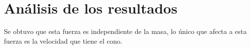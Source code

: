 \section{Análisis de los resultados}

Se obtuvo que esta fuerza es independiente de la masa, lo único
que afecta a esta fuerza es la velocidad que tiene el cono.
